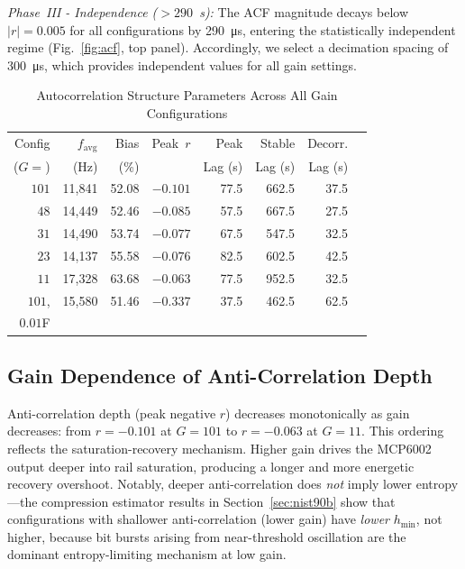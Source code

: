 \documentclass[conference]{IEEEtran}
\newcommand{\hmin}{\ensuremath{h_{\min}}}
\newcommand{\favg}{\ensuremath{f_{\mathrm{avg}}}}
\begin{document}
\textit{Phase~III - Independence ($>290$~\textmu{}s):} The ACF
magnitude decays below $|r|=0.005$ for all configurations by
\SI{290}{\micro\second}, entering the statistically independent
regime (Fig.~\ref{fig:acf}, top panel). Accordingly, we select a
decimation spacing of \SI{300}{\micro\second}, which provides
independent values for all gain settings.

\begin{table}[t]
\caption{Autocorrelation Structure Parameters Across All Gain Configurations}
\label{tab:acf}
\centering\small
\setlength{\tabcolsep}{3.5pt}
\begin{tabular}{@{}rrrrrrrr@{}}
\toprule
Config              & $\favg$  & Bias  & Peak~$r$ & Peak   & Stable & Decorr. \\
($G\!=\!$)              & (Hz)     & (\%)  &          & Lag (\textmu{}s) & Lag (\textmu{}s)& Lag (\textmu{}s) \\
\midrule
$101$         & 11{,}841 & 52.08 & $-0.101$ & 77.5  & 662.5 & 37.5 \\
$48$          & 14{,}449 & 52.46 & $-0.085$ & 57.5  & 667.5 & 27.5 \\
$31$          & 14{,}490 & 53.74 & $-0.077$ & 67.5  & 547.5 & 32.5 \\
$23$          & 14{,}137 & 55.58 & $-0.076$ & 82.5  & 602.5 & 42.5 \\
$11$          & 17{,}328 & 63.68 & $-0.063$ & 77.5  & 952.5 & 32.5 \\
$101$,  & 15{,}580 & 51.46 & $-0.337$ & 37.5 & 462.5 & 62.5 \\
$0.01$\textmu{}F \\
\bottomrule
\end{tabular}
\end{table}

\subsection{Gain Dependence of Anti-Correlation Depth}

Anti-correlation depth (peak negative $r$) decreases monotonically as
gain decreases: from $r=-0.101$ at $G=101$ to $r=-0.063$ at $G=11$.
This ordering reflects the saturation-recovery mechanism. Higher gain
drives the MCP6002 output deeper into rail saturation, producing a
longer and more energetic recovery overshoot. Notably, deeper
anti-correlation does \emph{not} imply lower entropy---the compression
estimator results in Section~\ref{sec:nist90b} show that
configurations with shallower anti-correlation (lower gain) have \emph{lower} $\hmin$, not higher, because bit bursts arising from near-threshold oscillation are the dominant entropy-limiting mechanism at low gain.
\end{document}
